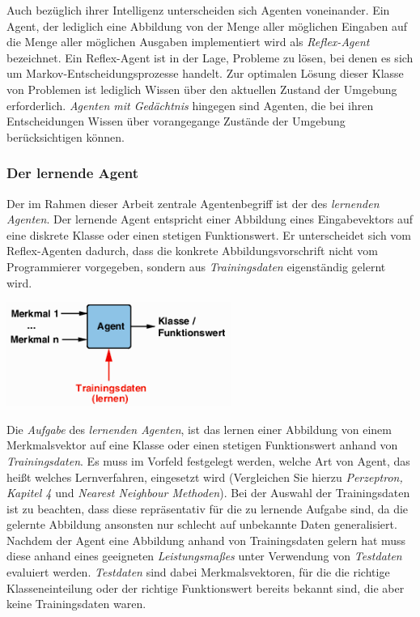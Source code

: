 \documentclass[fontsize=11pt]{scrartcl}
\newenvironment{Figure}
  {\par\medskip\noindent\minipage{\linewidth}}
  {\endminipage\par\medskip}
\begin{document}
                Auch bezüglich ihrer Intelligenz unterscheiden sich Agenten voneinander.
                Ein Agent, der lediglich eine Abbildung von der Menge aller möglichen Eingaben auf die Menge aller möglichen Ausgaben implementiert wird als \emph{Reflex-Agent} bezeichnet. Ein Reflex-Agent ist in der Lage, Probleme zu lösen, bei denen es sich um Markov-Entscheidungsprozesse handelt. Zur optimalen Lösung dieser Klasse von Problemen ist lediglich Wissen über den aktuellen Zustand der Umgebung erforderlich.\cite{ertel2016}
                \newline
                \emph{Agenten mit Gedächtnis} hingegen sind Agenten, die bei ihren Entscheidungen Wissen über vorangegange Zustände der Umgebung berücksichtigen können.\cite{ertel2016}
            
            \subsubsection{Der lernende Agent}
                Der im Rahmen dieser Arbeit zentrale Agentenbegriff ist der des \emph{lernenden Agenten}. Der lernende Agent entspricht einer Abbildung eines Eingabevektors auf eine diskrete Klasse oder einen stetigen Funktionswert. Er unterscheidet sich vom Reflex-Agenten dadurch, dass die konkrete Abbildungsvorschrift nicht vom Programmierer vorgegeben, sondern aus \emph{Trainingsdaten} eigenständig gelernt wird.
                \begin{Figure}
                   \centering
                   \includegraphics[scale=1]{lernenderagent.png}
                \end{Figure}
                Die \emph{Aufgabe} des \emph{lernenden Agenten}, ist das lernen einer Abbildung von einem Merkmalsvektor auf eine Klasse oder einen stetigen Funktionswert anhand von \emph{Trainingsdaten}. Es muss im Vorfeld festgelegt werden, welche Art von Agent, das heißt welches Lernverfahren, eingesetzt wird (Vergleichen Sie hierzu \emph{Perzeptron, Kapitel 4} und \emph{Nearest Neighbour Methoden}).
                Bei der Auswahl der Trainingsdaten ist zu beachten, dass diese repräsentativ für die zu lernende Aufgabe sind, da die gelernte Abbildung ansonsten nur schlecht auf unbekannte Daten generalisiert.\\
                Nachdem der Agent eine Abbildung anhand von Trainingsdaten gelern hat muss diese anhand eines geeigneten \emph{Leistungsmaßes} unter Verwendung von \emph{Testdaten} evaluiert werden. \emph{Testdaten} sind dabei Merkmalsvektoren, für die  die richtige Klasseneinteilung oder der richtige Funktionswert bereits bekannt sind, die aber keine Trainingsdaten waren.
\end{document}
